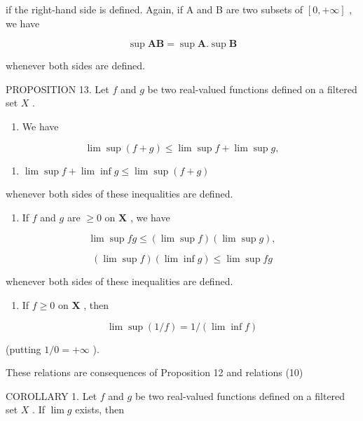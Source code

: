 if the right-hand side is defined. Again, if A and B are two subsets of \([0, +\infty]\) , we have

\[
\sup \mathbf {A B} = \sup \mathbf {A}. \sup \mathbf {B}\tag{27}
\]

whenever both sides are defined.

PROPOSITION 13. Let \(f\) and \(g\) be two real-valued functions defined on a filtered set \(X\) .

\begin{enumerate}
\def\labelenumi{(\roman{enumi})}
\tightlist
\item
  We have
\end{enumerate}

\[
\lim \sup (f + g) \leqslant \lim \sup f + \lim \sup g, \tag {28}
\]

\begin{enumerate}
\def\labelenumi{(\arabic{enumi})}
\setcounter{enumi}{28}
\tightlist
\item
  \(\lim \sup f + \lim \inf g \leqslant \lim \sup (f + g)\)
\end{enumerate}

whenever both sides of these inequalities are defined.

\begin{enumerate}
\def\labelenumi{(\roman{enumi})}
\setcounter{enumi}{1}
\tightlist
\item
  If \(f\) and \(g\) are \(\geqslant 0\) on \(\mathbf{X}\) , we have
\end{enumerate}

\[
\lim \sup f g \leqslant (\lim \sup f) (\lim \sup g), \tag {30}
\]

\[
(\lim \sup f) (\lim \inf g) \leqslant \lim \sup f g \tag {31}
\]

whenever both sides of these inequalities are defined.

\begin{enumerate}
\def\labelenumi{(\roman{enumi})}
\setcounter{enumi}{2}
\tightlist
\item
  If \(f \geqslant 0\) on \(\mathbf{X}\) , then
\end{enumerate}

\[
\lim \sup (1 / f) = 1 / (\lim \inf f)\tag{32}
\]

(putting \(1 / 0 = +\infty\) ).

These relations are consequences of Proposition 12 and relations (10)

COROLLARY 1. Let \(f\) and \(g\) be two real-valued functions defined on a filtered set \(X\) . If \(\lim g\) exists, then

